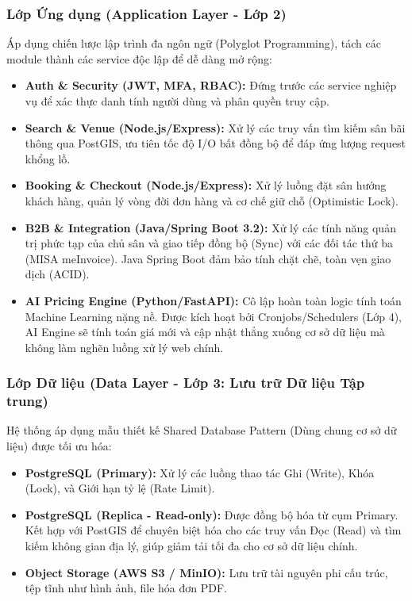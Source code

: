 \subsubsection{Lớp Ứng dụng (Application Layer - Lớp 2)}
Áp dụng chiến lược lập trình đa ngôn ngữ (Polyglot Programming), tách các module thành các service độc lập để dễ dàng mở rộng:
\begin{itemize}
    \item \textbf{Auth \& Security (JWT, MFA, RBAC):} Đứng trước các service nghiệp vụ để xác thực danh tính người dùng và phân quyền truy cập.
    \item \textbf{Search \& Venue (Node.js/Express):} Xử lý các truy vấn tìm kiếm sân bãi thông qua PostGIS, ưu tiên tốc độ I/O bất đồng bộ để đáp ứng lượng request khổng lồ.
    \item \textbf{Booking \& Checkout (Node.js/Express):} Xử lý luồng đặt sân hướng khách hàng, quản lý vòng đời đơn hàng và cơ chế giữ chỗ (Optimistic Lock).
    \item \textbf{B2B \& Integration (Java/Spring Boot 3.2):} Xử lý các tính năng quản trị phức tạp của chủ sân và giao tiếp đồng bộ (Sync) với các đối tác thứ ba (MISA meInvoice). Java Spring Boot đảm bảo tính chặt chẽ, toàn vẹn giao dịch (ACID).
    \item \textbf{AI Pricing Engine (Python/FastAPI):} Cô lập hoàn toàn logic tính toán Machine Learning nặng nề. Được kích hoạt bởi Cronjobs/Schedulers (Lớp 4), AI Engine sẽ tính toán giá mới và cập nhật thẳng xuống cơ sở dữ liệu mà không làm nghẽn luồng xử lý web chính.
\end{itemize}

\subsubsection{Lớp Dữ liệu (Data Layer - Lớp 3: Lưu trữ Dữ liệu Tập trung)}
Hệ thống áp dụng mẫu thiết kế Shared Database Pattern (Dùng chung cơ sở dữ liệu) được tối ưu hóa:
\begin{itemize}
    \item \textbf{PostgreSQL (Primary):} Xử lý các luồng thao tác Ghi (Write), Khóa (Lock), và Giới hạn tỷ lệ (Rate Limit).
    \item \textbf{PostgreSQL (Replica - Read-only):} Được đồng bộ hóa từ cụm Primary. Kết hợp với PostGIS để chuyên biệt hóa cho các truy vấn Đọc (Read) và tìm kiếm không gian địa lý, giúp giảm tải tối đa cho cơ sở dữ liệu chính.
    \item \textbf{Object Storage (AWS S3 / MinIO):} Lưu trữ tài nguyên phi cấu trúc, tệp tĩnh như hình ảnh, file hóa đơn PDF.
\end{itemize}

